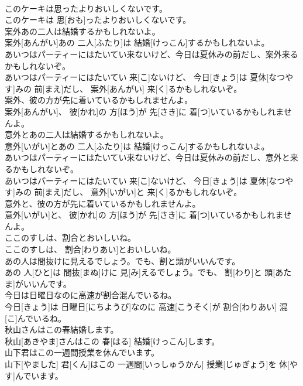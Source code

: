 \documentclass[8pt]{extreport}
\begin{document}
\begin{CJK}{UTF8}{min}
\\	このケーキは思ったよりおいしくないです。	
\\	このケーキは 思[おも]ったよりおいしくないです。
\\	案外あの二人は結婚するかもしれないよ。	
\\	案外[あんがい]あの 二人[ふたり]は 結婚[けっこん]するかもしれないよ。
\\	あいつはパーティーにはたいてい来ないけど、今日は夏休みの前だし、案外来るかもしれないぞ。	
\\	あいつはパーティーにはたいてい 来[こ]ないけど、 今日[きょう]は 夏休[なつやす]みの 前[まえ]だし、 案外[あんがい] 来[く]るかもしれないぞ。
\\	案外、彼の方が先に着いているかもしれませんよ。	
\\	案外[あんがい]、 彼[かれ]の 方[ほう]が 先[さき]に 着[つ]いているかもしれませんよ。
\\	意外とあの二人は結婚するかもしれないよ。	
\\	意外[いがい]とあの 二人[ふたり]は 結婚[けっこん]するかもしれないよ。
\\	あいつはパーティーにはたいてい来ないけど、今日は夏休みの前だし、意外と来るかもしれないぞ。	
\\	あいつはパーティーにはたいてい 来[こ]ないけど、 今日[きょう]は 夏休[なつやす]みの 前[まえ]だし、 意外[いがい]と 来[く]るかもしれないぞ。
\\	意外と、彼の方が先に着いているかもしれませんよ。	
\\	意外[いがい]と、 彼[かれ]の 方[ほう]が 先[さき]に 着[つ]いているかもしれませんよ。
\\	ここのすしは、割合とおいしいね。	
\\	ここのすしは、 割合[わりあい]とおいしいね。
\\	あの人は間抜けに見えるでしょう。でも、割と頭がいいんです。	
\\	あの 人[ひと]は 間抜[まぬ]けに 見[み]えるでしょう。でも、 割[わり]と 頭[あたま]がいいんです。
\\	今日は日曜日なのに高速が割合混んでいるね。	
\\	今日[きょう]は 日曜日[にちようび]なのに 高速[こうそく]が 割合[わりあい] 混[こ]んでいるね。
\\	秋山さんはこの春結婚します。	
\\	秋山[あきやま]さんはこの 春[はる] 結婚[けっこん]します。
\\	山下君はこの一週間授業を休んでいます。	
\\	山下[やました] 君[くん]はこの 一週間[いっしゅうかん] 授業[じゅぎょう]を 休[やす]んでいます。

\end{CJK}
\end{document}
